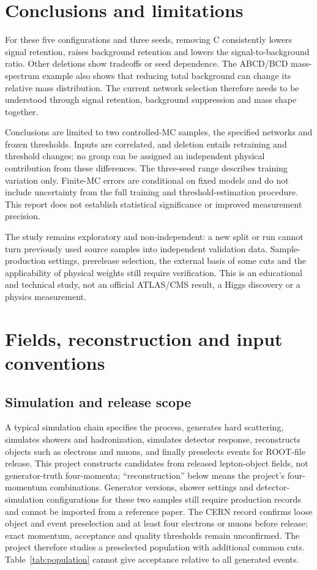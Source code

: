 \documentclass[11pt,a4paper]{article}
\begin{document}
\section{Conclusions and limitations}\label{sec:conclusion}
For these five configurations and three seeds, removing C consistently lowers signal retention, raises background retention and lowers the signal-to-background ratio.
Other deletions show tradeoffs or seed dependence.
The ABCD/BCD mass-spectrum example also shows that reducing total background can change its relative mass distribution.
The current network selection therefore needs to be understood through signal retention, background suppression and mass shape together.

Conclusions are limited to two controlled-MC samples, the specified networks and frozen thresholds.
Inputs are correlated, and deletion entails retraining and threshold changes; no group can be assigned an independent physical contribution from these differences.
The three-seed range describes training variation only. Finite-MC errors are conditional on fixed models and do not include uncertainty from the full training and threshold-estimation procedure.
This report does not establish statistical significance or improved measurement precision.

The study remains exploratory and non-independent: a new split or run cannot turn previously used source samples into independent validation data.
Sample-production settings, prerelease selection, the external basis of some cuts and the applicability of physical weights still require verification.
This is an educational and technical study, not an official ATLAS/CMS result, a Higgs discovery or a physics measurement.

\clearpage
\appendix
\section{Fields, reconstruction and input conventions}\label{app:fields}

\subsection{Simulation and release scope}
A typical simulation chain specifies the process, generates hard scattering, simulates showers and hadronization, simulates detector response, reconstructs objects such as electrons and muons, and finally preselects events for ROOT-file release.
This project constructs candidates from released lepton-object fields, not generator-truth four-momenta; ``reconstruction'' below means the project's four-momentum combinations.
Generator versions, shower settings and detector-simulation configurations for these two samples still require production records and cannot be imported from a reference paper.
The CERN record confirms loose object and event preselection and at least four electrons or muons before release; exact momentum, acceptance and quality thresholds remain unconfirmed.
The project therefore studies a preselected population with additional common cuts. Table~\ref{tab:population} cannot give acceptance relative to all generated events.
\end{document}
